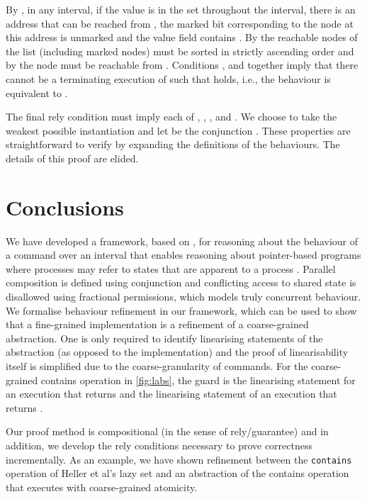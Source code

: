 \documentclass{article}
\theoremstyle{plain}
\theoremstyle{definition}
\begin{document}
By , in any interval, if the value  is in the set
throughout the interval, there is an address that can be reached from
, the marked bit corresponding to the node at this address is
unmarked and the value field contains . By  the
reachable nodes of the list (including marked nodes) must be sorted in
strictly ascending order and by  the  node must be
reachable from . Conditions ,  and
 together imply that there cannot be a terminating
execution of  such that  holds,
i.e., the behaviour is equivalent to .


\smallskip 
{}
The final rely condition  must imply each of , , ,  and . We choose to take the
weakest possible instantiation and let  be the conjunction
. These
properties are straightforward to verify by expanding the definitions
of the behaviours. The details of this proof are elided.





\section{Conclusions}

We have developed a framework, based on \cite{DDH12}, for reasoning
about the behaviour of a command over an interval that enables
reasoning about pointer-based programs where processes may refer to
states that are apparent to a process \cite{HBDJ13}. Parallel
composition is defined using conjunction and conflicting access to
shared state is disallowed using fractional permissions, which models
truly concurrent behaviour.  We formalise behaviour refinement in our
framework, which can be used to show that a fine-grained
implementation is a refinement of a coarse-grained abstraction. One is
only required to identify linearising statements of the abstraction
(as opposed to the implementation) and the proof of linearisability
itself is simplified due to the coarse-granularity of commands. For
the coarse-grained contains operation in \ref{fig:labs}, the guard
 is the linearising statement for an execution
that returns  and  the linearising statement of
an execution that returns .

Our proof method is compositional (in the sense of rely/guarantee) and
in addition, we develop the rely conditions necessary to prove
correctness incrementally. As an example, we have shown refinement
between the \texttt{contains} operation of Heller et al's lazy set and
an abstraction of the contains operation that executes with
coarse-grained
atomicity. 
\end{document}
